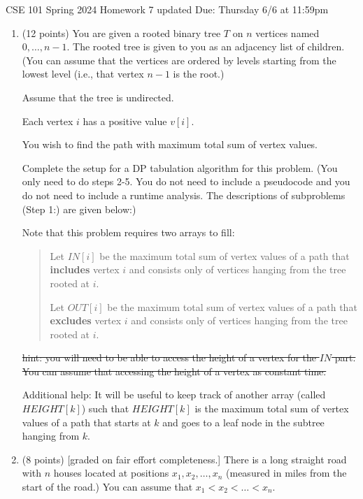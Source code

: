 \documentclass[10pt,letterpaper,unboxed,cm]{article}
\begin{document}
\hfill{CSE 101 Spring 2024}
\hfill{Homework 7 {\color{blue} updated}}
\hfill{Due: Thursday 6/6 at 11:59pm}






\begin{enumerate}
\item (12 points)
You are given a rooted binary tree $T$ on $n$ vertices named $0,\dots, n-1$. The rooted tree is given to you as an adjacency list of children. (You can assume that the vertices are ordered by levels starting from the lowest level (i.e., that vertex $n-1$ is the root.)

{\color{blue} Assume that the tree is undirected.}

Each vertex $i$ has a positive value $v[i]$.

You wish to find the path with maximum total sum of vertex values.


Complete the setup for a DP tabulation algorithm for this problem. (You only need to do steps 2-5. You do not need to include a pseudocode and you do not need to include a runtime analysis. The descriptions of subproblems (Step 1:) are given below:)


Note that this problem requires two arrays to fill:
\begin{quote}
Let $IN[i]$ be the maximum total sum of vertex values of a path that {\bf includes} vertex $i$ and consists only of vertices hanging from the tree rooted at $i$.

Let $OUT[i]$ be the maximum total sum of vertex values of a path that {\bf excludes} vertex $i$ and consists only of vertices hanging from the tree rooted at $i$.
\end{quote}

\sout{{\color{blue} hint: you will need to be able to access the height of a vertex for the $IN$ part.}}\\
\sout{{\color{blue} You can assume that accessing the height of a vertex as constant time.}}

{\color{purple} Additional help: It will be useful to keep track of another array (called $HEIGHT[k]$) such that $HEIGHT[k]$ is the maximum total sum of vertex values of a path that starts at $k$ and goes to a leaf node in the subtree hanging from $k$.}



\item (8 points) [graded on fair effort completeness.]
There is a long straight road with $n$ houses located at positions $x_1,x_2,\dots,x_n$ (measured in miles from the start of the road.) You can assume that $x_1<x_2<\dots < x_n$.


\end{enumerate}
\end{document}
